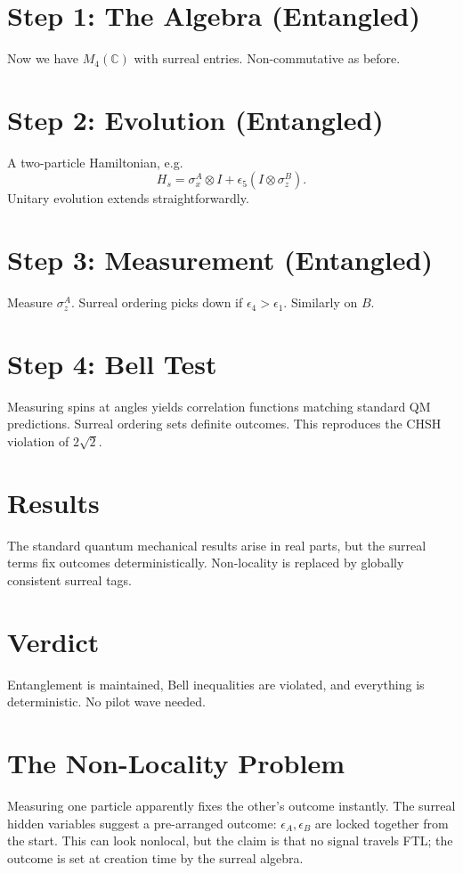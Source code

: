 \documentclass{article}
\begin{document}
\section{Step 1: The Algebra (Entangled)}
Now we have \(M_4(\mathbb{C})\) with surreal entries. Non-commutative as before.

\section{Step 2: Evolution (Entangled)}
A two-particle Hamiltonian, e.g.\ 
\[
H_s = \sigma_x^A \otimes I + \epsilon_5 (I \otimes \sigma_z^B).
\]
Unitary evolution extends straightforwardly.

\section{Step 3: Measurement (Entangled)}
Measure \(\sigma_z^A\). Surreal ordering picks down if \(\epsilon_4 > \epsilon_1\). Similarly on \(B\).

\section{Step 4: Bell Test}
Measuring spins at angles yields correlation functions matching standard QM predictions. Surreal ordering sets definite outcomes. This reproduces the CHSH violation of \(2\sqrt{2}\).

\section{Results}
The standard quantum mechanical results arise in real parts, but the surreal terms fix outcomes deterministically. Non-locality is replaced by globally consistent surreal tags.

\section{Verdict}
Entanglement is maintained, Bell inequalities are violated, and everything is deterministic. No pilot wave needed.

\section{The Non-Locality Problem}
Measuring one particle apparently fixes the other's outcome instantly. The surreal hidden variables suggest a pre-arranged outcome: \(\epsilon_A,\epsilon_B\) are locked together from the start. This can look nonlocal, but the claim is that no signal travels FTL; the outcome is set at creation time by the surreal algebra.
\end{document}
